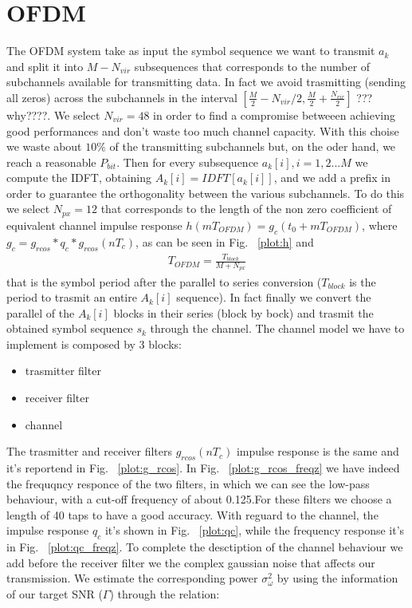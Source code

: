 \documentclass[a4paper,oneside]{article}
\begin{document}
\section{OFDM}
\label{sec:ofdm}
The OFDM system take as input the symbol sequence we want to transmit $a_k$ and split it into $M-N_{vir}$ subsequences that corresponds to the number of subchannels available for transmitting data. In fact we avoid trasmitting (sending all zeros) across the subchannels in the interval $[\frac{M}{2}-N_{vir}/2,\frac{M}{2}+\frac{N_{vir}}{2}]$ ???why????.
We select $N_{vir} = 48$ in order to find a compromise betweeen achieving good performances and don't waste too much channel capacity. With this choise we waste about $ 10\% $ of the transmitting subchannels but, on the oder hand, we reach a reasonable $ P_{bit} $.
Then for every subsequence $a_k[i], i = 1,2...M$ we compute the IDFT, obtaining $A_k[i] = IDFT[a_k[i]]$, and we add a prefix in order to guarantee the orthogonality between the various subchannels. To do this we select $N_{px} = 12$ that corresponds to the length of the non zero coefficient of equivalent channel impulse response $h(mT_{OFDM}) = g_c(t_0+ mT_{OFDM})$, where $g_c = g_{rcos}*q_c*g_{rcos}(nT_c)$, as can be seen in Fig. ~\ref{plot:h} and 
\begin{align*}
T_{OFDM} = \frac{T_{block}}{M+N_{px}}
\end{align*} 
that is the symbol period after the parallel to series conversion ($T_{block}$ is the period to trasmit an entire $A_k[i]$ sequence).
In fact finally we convert the parallel of the $A_k[i]$ blocks in their series (block by bock) and trasmit the obtained symbol sequence $s_k$ through the channel.
\newline The channel model we have to implement is composed by 3 blocks:
\begin{itemize}
\item trasmitter filter
\item receiver filter
\item channel
\end{itemize} 
The trasmitter and receiver filters $g_{rcos}(nT_c)$ impulse response is the same and it's reportend in Fig. ~\ref{plot:g_rcos}. In Fig. ~\ref{plot:g_rcos_freqz} we have indeed the frequqncy responce of the two filters, in which we can see the low-pass behaviour, with a cut-off frequency of about 0.125.For these filters we choose a length of 40 taps to have a good accuracy. With reguard to the channel, the impulse response $q_c$ it's shown in Fig. ~\ref{plot:qc}, while the frequency response it's in Fig. ~\ref{plot:qc_freqz}.
To complete the desctiption of the channel behaviour we add before the receiver filter we the complex gaussian noise that affects our transmission. We estimate the corresponding power $\sigma_{\omega}^2$ by using the information of our target SNR ($\Gamma$) through the relation:
\end{document}
